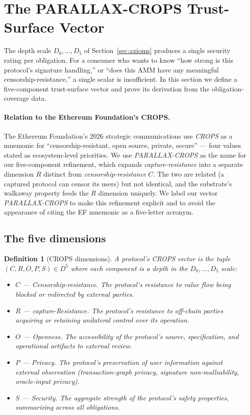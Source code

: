 \documentclass[11pt,a4paper]{article}
\newtheorem{definition}[theorem]{Definition}
\begin{document}
\section{The PARALLAX-CROPS Trust-Surface Vector}\label{sec:crops}

The depth scale $D_0,\dots,D_5$ of Section~\ref{sec:axioms} produces a single security rating per obligation. For a consumer who wants to know ``how strong is this protocol's signature handling,'' or ``does this AMM have any meaningful censorship-resistance,'' a single scalar is insufficient. In this section we define a five-component trust-surface vector and prove its derivation from the obligation-coverage data.

\paragraph{Relation to the Ethereum Foundation's CROPS.} The Ethereum Foundation's 2026 strategic communications use \emph{CROPS} as a mnemonic for ``censorship-resistant, open source, private, secure'' --- four values stated as ecosystem-level priorities. We use \emph{PARALLAX-CROPS} as the name for our five-component refinement, which expands \emph{capture-resistance} into a separate dimension $R$ distinct from \emph{censorship-resistance} $C$. The two are related (a captured protocol can censor its users) but not identical, and the substrate's walkaway property feeds the $R$ dimension uniquely. We label our vector \emph{PARALLAX-CROPS} to make this refinement explicit and to avoid the appearance of citing the EF mnemonic as a five-letter acronym.

\subsection{The five dimensions}

\begin{definition}[CROPS dimensions]\label{def:crops}
A protocol's \emph{CROPS vector} is the tuple $(C, R, O, P, S) \in D^5$ where each component is a depth in the $D_0,\dots,D_5$ scale:
\begin{itemize}
  \item $C$ --- \emph{Censorship-resistance.} The protocol's resistance to value flow being blocked or redirected by external parties.
  \item $R$ --- \emph{capture-Resistance.} The protocol's resistance to off-chain parties acquiring or retaining unilateral control over its operation.
  \item $O$ --- \emph{Openness.} The accessibility of the protocol's source, specification, and operational artifacts to external review.
  \item $P$ --- \emph{Privacy.} The protocol's preservation of user information against external observation (transaction-graph privacy, signature non-malleability, oracle-input privacy).
  \item $S$ --- \emph{Security.} The aggregate strength of the protocol's safety properties, summarizing across all obligations.
\end{itemize}
\end{definition}
\end{document}
